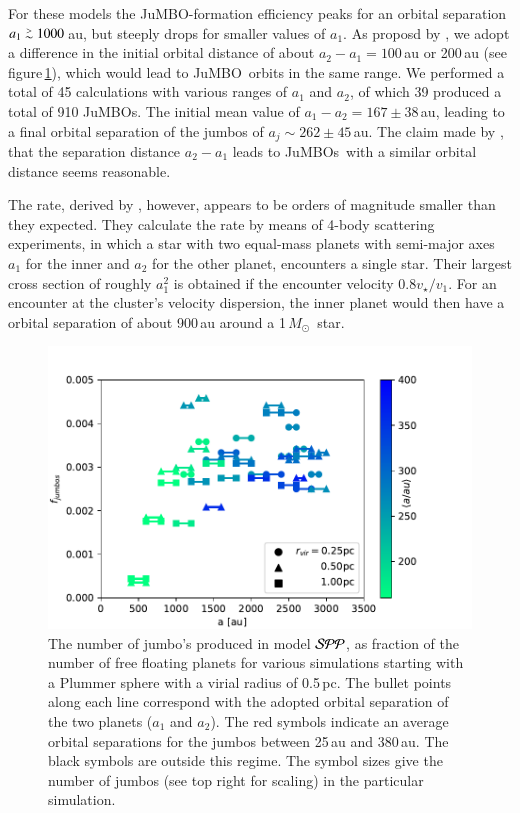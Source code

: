 \documentclass[aa]{lib/aa}
\newcommand{\MSun}{\mbox{${M}_\odot$}}
\def\apgt{\ {\raise-.5ex\hbox{$\buildrel>\over\sim$}}\ }
\newcommand{\jumbo}{\mbox{JuMBO}}
\newcommand{\jumbos}{\mbox{JuMBOs}}
\begin{document}
For these models the \jumbo-formation efficiency peaks for an orbital
separation $a_1 \apgt 1000$\,au, but steeply drops for smaller values
of $a_1$. As proposd by \cite{2023arXiv231006016W}, we adopt a
difference in the initial orbital distance of about $a_2-a_1 =
100$\,au or 200\,au (see figure\,\ref{Fig:fjumbos_from_PP}), which
would lead to \jumbo\, orbits in the same range.  We performed a total
of 45 calculations with various ranges of $a_1$ and $a_2$, of which 39
produced a total of 910 \jumbos. The initial mean value of $a_1-a_2 =
167\pm38$\,au, leading to a final orbital separation of the jumbos of
$a_j \sim 262\pm45$\,au.  The claim made by
\cite{2023arXiv231006016W}, that the separation distance $a_2-a_1$
leads to \jumbos\, with a similar orbital distance seems reasonable.

The rate, derived by \cite{2023arXiv231006016W}, however, appears to
be orders of magnitude smaller than they expected.  They calculate the
rate by means of 4-body scattering experiments, in which a star with
two equal-mass planets with semi-major axes $a_1$ for the inner and
$a_2$ for the other planet, encounters a single star. Their largest
cross section of roughly $a_1^2$ is obtained if the encounter velocity
$0.8v_\star/v_1$. For an encounter at the cluster's velocity
dispersion, the inner planet would then have a orbital separation of
about 900\,au around a 1\,\MSun\, star.

\begin{figure}
    \centering
        \includegraphics[width=.91\columnwidth]{figures/fig_fjumbos_from_psystems.pdf}
        \caption{The number of jumbo's produced in model ${\cal SPP}$,
          as fraction of the number of free floating planets for
          various simulations starting with a Plummer sphere with a
          virial radius of 0.5\,pc.  The bullet points along each line
          correspond with the adopted orbital separation of the two
          planets ($a_1$ and $a_2$).  The red symbols indicate an
          average orbital separations for the jumbos between 25\,au
          and 380\,au.  The black symbols are outside this regime.
          The symbol sizes give the number of jumbos (see top right
          for scaling) in the particular simulation.  }
         \label{Fig:fjumbos_from_PP}
\end{figure}
\end{document}
